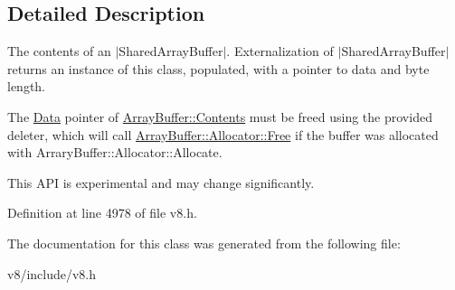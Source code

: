 \subsection{Detailed Description}
The contents of an $\vert$\+Shared\+Array\+Buffer$\vert$. Externalization of $\vert$\+Shared\+Array\+Buffer$\vert$ returns an instance of this class, populated, with a pointer to data and byte length.

The \mbox{\hyperlink{classv8_1_1Data}{Data}} pointer of \mbox{\hyperlink{classv8_1_1ArrayBuffer_1_1Contents}{Array\+Buffer\+::\+Contents}} must be freed using the provided deleter, which will call \mbox{\hyperlink{classv8_1_1ArrayBuffer_1_1Allocator_a419f59d2a103a5a8863809d7977c9cd8}{Array\+Buffer\+::\+Allocator\+::\+Free}} if the buffer was allocated with Arrary\+Buffer\+::\+Allocator\+::\+Allocate.

This A\+PI is experimental and may change significantly. 

Definition at line 4978 of file v8.\+h.



The documentation for this class was generated from the following file\+:\begin{DoxyCompactItemize}
\item 
v8/include/v8.\+h\end{DoxyCompactItemize}
